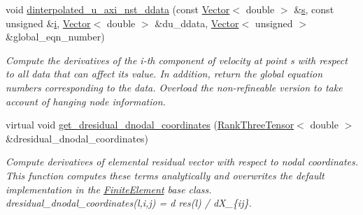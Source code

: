 \begin{DoxyCompactItemize}
void \hyperlink{classoomph_1_1RefineableAxisymmetricNavierStokesEquations_ac1a49ddb1942c4ee2d5cacb94b1c9251}{dinterpolated\+\_\+u\+\_\+axi\+\_\+nst\+\_\+ddata} (const \hyperlink{classoomph_1_1Vector}{Vector}$<$ double $>$ \&\hyperlink{cfortran_8h_ab7123126e4885ef647dd9c6e3807a21c}{s}, const unsigned \&\hyperlink{cfortran_8h_adb50e893b86b3e55e751a42eab3cba82}{i}, \hyperlink{classoomph_1_1Vector}{Vector}$<$ double $>$ \&du\+\_\+ddata, \hyperlink{classoomph_1_1Vector}{Vector}$<$ unsigned $>$ \&global\+\_\+eqn\+\_\+number)
\begin{DoxyCompactList}\small\item\em Compute the derivatives of the i-\/th component of velocity at point s with respect to all data that can affect its value. In addition, return the global equation numbers corresponding to the data. Overload the non-\/refineable version to take account of hanging node information. \end{DoxyCompactList}\item 
virtual void \hyperlink{classoomph_1_1RefineableAxisymmetricNavierStokesEquations_ab790c42884b501ba2d6d58f92eb26a6a}{get\+\_\+dresidual\+\_\+dnodal\+\_\+coordinates} (\hyperlink{classoomph_1_1RankThreeTensor}{Rank\+Three\+Tensor}$<$ double $>$ \&dresidual\+\_\+dnodal\+\_\+coordinates)
\begin{DoxyCompactList}\small\item\em Compute derivatives of elemental residual vector with respect to nodal coordinates. This function computes these terms analytically and overwrites the default implementation in the \hyperlink{classoomph_1_1FiniteElement}{Finite\+Element} base class. dresidual\+\_\+dnodal\+\_\+coordinates(l,i,j) = d res(l) / d\+X\+\_\+\{ij\}. \end{DoxyCompactList}\end{DoxyCompactItemize}
